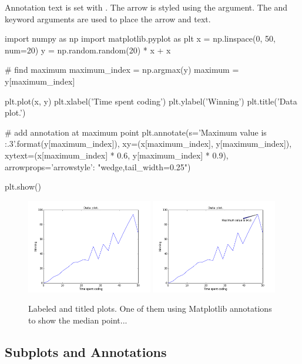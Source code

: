 \documentclass[11pt]{cselabheader}
\begin{document}
Annotation text is set with . The arrow is styled
using the  argument.  The 
and  keyword arguments are used to place the
arrow and text.

\begin{python3code}
import numpy as np
import matplotlib.pyplot as plt
x = np.linspace(0, 50, num=20)
y = np.random.random(20) * x + x

# find maximum
maximum_index = np.argmax(y)
maximum = y[maximum_index]

plt.plot(x, y)
plt.xlabel('Time spent coding')
plt.ylabel('Winning')
plt.title('Data plot.')

# add annotation at maximum point
plt.annotate(s='Maximum value is {:.3}'.format(y[maximum_index]),
             xy=(x[maximum_index], y[maximum_index]),
             xytext=(x[maximum_index] * 0.6, y[maximum_index] * 0.9),
             arrowprops={'arrowstyle': "wedge,tail_width=0.25"})

plt.show()
\end{python3code}

\begin{figure}[H]
  \centering
  \includegraphics[width=0.49\textwidth]{img/matplotlib_labeled1.png}
  \includegraphics[width=0.49\textwidth]{img/matplotlib_labeled2.png}
  \caption{Labeled and titled plots. One of them using Matplotlib
annotations to show the median point...}
\end{figure}

\subsection{Subplots and Annotations}
\end{document}
